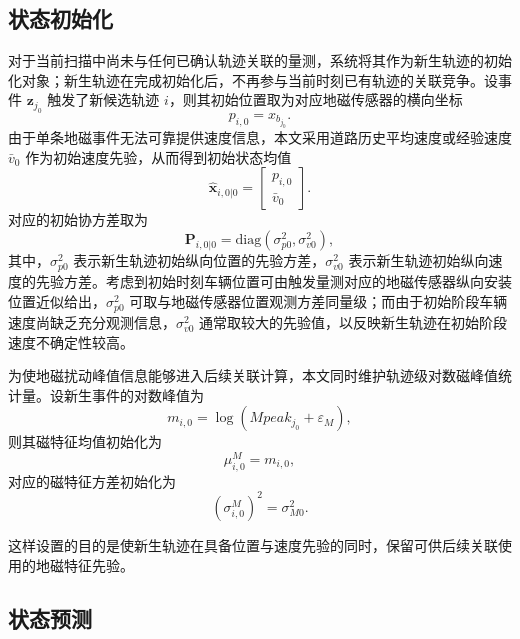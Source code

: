 \documentclass{xdupgthesis}
\begin{document}
\subsection{状态初始化}

对于当前扫描中尚未与任何已确认轨迹关联的量测，系统将其作为新生轨迹的初始化对象；新生轨迹在完成初始化后，不再参与当前时刻已有轨迹的关联竞争。设事件 $\mathbf z_{j_0}$ 触发了新候选轨迹 $i$，则其初始位置取为对应地磁传感器的横向坐标
\begin{equation}
	p_{i,0}=x_{b_{j_0}}.
	\label{eq:ch3_init_pos}
\end{equation}
由于单条地磁事件无法可靠提供速度信息，本文采用道路历史平均速度或经验速度 $\bar v_0$ 作为初始速度先验，从而得到初始状态均值
\begin{equation}
	\hat{\mathbf x}_{i,0|0}=
	\begin{bmatrix}
		p_{i,0}\\
		\bar v_0
	\end{bmatrix}.
	\label{eq:ch3_init_state}
\end{equation}
对应的初始协方差取为
\begin{equation}
	\mathbf P_{i,0|0}=\mathrm{diag}\left(\sigma_{p0}^{2},\sigma_{v0}^{2}\right),
	\label{eq:ch3_init_cov}
\end{equation}
其中，$\sigma_{p0}^{2}$ 表示新生轨迹初始纵向位置的先验方差，$\sigma_{v0}^{2}$ 表示新生轨迹初始纵向速度的先验方差。考虑到初始时刻车辆位置可由触发量测对应的地磁传感器纵向安装位置近似给出，$\sigma_{p0}^{2}$ 可取与地磁传感器位置观测方差同量级；而由于初始阶段车辆速度尚缺乏充分观测信息，$\sigma_{v0}^{2}$ 通常取较大的先验值，以反映新生轨迹在初始阶段速度不确定性较高。

为使地磁扰动峰值信息能够进入后续关联计算，本文同时维护轨迹级对数磁峰值统计量。设新生事件的对数峰值为
\begin{equation}
	m_{i,0}=\log(Mpeak_{j_0}+\varepsilon_M),
	\label{eq:ch3_init_mag}
\end{equation}
则其磁特征均值初始化为
\begin{equation}
	\mu_{i,0}^{M}=m_{i,0},
	\label{eq:ch3_init_mag_mean}
\end{equation}
对应的磁特征方差初始化为
\begin{equation}
	(\sigma_{i,0}^{M})^{2}=\sigma_{M0}^{2}.
	\label{eq:ch3_init_mag_var}
\end{equation}

这样设置的目的是使新生轨迹在具备位置与速度先验的同时，保留可供后续关联使用的地磁特征先验。

\subsection{状态预测}
\end{document}
